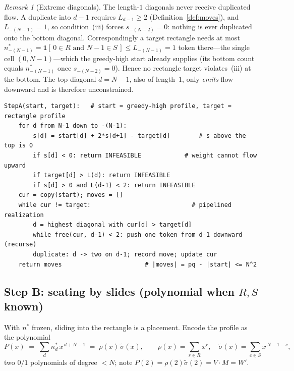 \documentclass[11pt]{article}
\theoremstyle{definition}
\theoremstyle{plain}
\theoremstyle{remark}
\newtheorem{remark}{Remark}
\begin{document}
\begin{remark}[Extreme diagonals]
The length-$1$ diagonals never receive duplicated flow. A duplicate into $d-1$ requires
$L_{d-1}\ge2$ (Definition~\ref{def:moves}), and $L_{-(N-1)}=1$, so condition~(iii) forces
$s_{-(N-2)}=0$: nothing is ever duplicated onto the bottom diagonal. Correspondingly a target
rectangle needs at most $n^{*}_{-(N-1)}=\mathbf 1[\,0\in R\text{ and }N-1\in S\,]\le
L_{-(N-1)}=1$ token there---the single cell $(0,N-1)$---which the greedy-high start already
supplies (its bottom count equals $n^{*}_{-(N-1)}$ once $s_{-(N-2)}=0$). Hence no rectangle
target violates~(iii) at the bottom. The top diagonal $d=N-1$, also of length~$1$, only
\emph{emits} flow downward and is therefore unconstrained.
\end{remark}

\begin{verbatim}
StepA(start, target):   # start = greedy-high profile, target = rectangle profile
    for d from N-1 down to -(N-1):
        s[d] = start[d] + 2*s[d+1] - target[d]        # s above the top is 0
        if s[d] < 0: return INFEASIBLE            # weight cannot flow upward
        if target[d] > L(d): return INFEASIBLE
        if s[d] > 0 and L(d-1) < 2: return INFEASIBLE
    cur = copy(start); moves = []
    while cur != target:                            # pipelined realization
        d = highest diagonal with cur[d] > target[d]
        while free(cur, d-1) < 2: push one token from d-1 downward (recurse)
        duplicate: d -> two on d-1; record move; update cur
    return moves                       # |moves| = pq - |start| <= N^2
\end{verbatim}

\subsection{Step B: seating by slides (polynomial when \texorpdfstring{$R,S$}{R,S} known)}\label{sec:stepB}

With $n^{*}$ frozen, sliding into the rectangle is a placement.  Encode the
profile as the polynomial
\[
P(x)\;=\;\sum_d n^{*}_d\,x^{\,d+N-1}\;=\;\rho(x)\,\tilde\sigma(x),\qquad
\rho(x)=\sum_{r\in R}x^{r},\quad \tilde\sigma(x)=\sum_{c\in S}x^{\,N-1-c},
\]
two $0/1$ polynomials of degree $<N$; note $P(2)=\rho(2)\tilde\sigma(2)=V\cdot
M=W'$.
\end{document}
